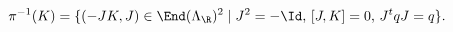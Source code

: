 \begin{equation}
\label{eq:fibres}
  \pi^{-1}(K) = \{ (-J K, J) \in \End(\Lambda_\R)^2 \mid \text{$J^2 =
  -\Id$, $[J,K] = 0$, $J^tqJ =q$} \}.
\end{equation}

